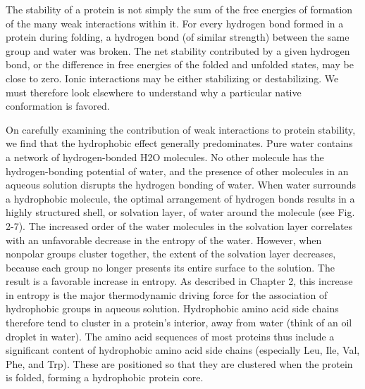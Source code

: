 The stability of a protein is not simply the sum of the free energies of formation of the many weak interactions within it. For every hydrogen bond formed in a protein during folding, a hydrogen bond (of similar strength) between the same group and water was broken. The net stability contributed by a given hydrogen bond, or the difference in free energies of the folded and unfolded states, may be close to zero. Ionic interactions may be either stabilizing or destabilizing. We must therefore look elsewhere to understand why a particular native conformation is favored. 

On carefully examining the contribution of weak interactions to protein stability, we find that the hydrophobic effect generally predominates. Pure water contains a network of hydrogen-bonded H2O molecules. No other molecule has the hydrogen-bonding potential of water, and the presence of other molecules in an aqueous solution disrupts the hydrogen bonding of water. When water surrounds a hydrophobic molecule, the optimal arrangement of hydrogen bonds results in a highly structured shell, or solvation layer, of water around the molecule (see Fig. 2-7). The increased order of the water molecules in the solvation layer correlates with an unfavorable decrease in the entropy of the water. However, when nonpolar groups cluster together, the extent of the solvation layer decreases, because each group no longer presents its entire surface to the solution. The result is a favorable increase in entropy. As described in Chapter 2, this increase in entropy is the major thermodynamic driving force for the association of hydrophobic groups in aqueous solution. Hydrophobic amino acid side chains therefore tend to cluster in a protein’s interior, away from water (think of an oil droplet in water). The amino acid sequences of most proteins thus include a significant content of hydrophobic amino acid side chains (especially Leu, Ile, Val, Phe, and Trp). These are positioned so that they are clustered when the protein is folded, forming a hydrophobic protein core. 

